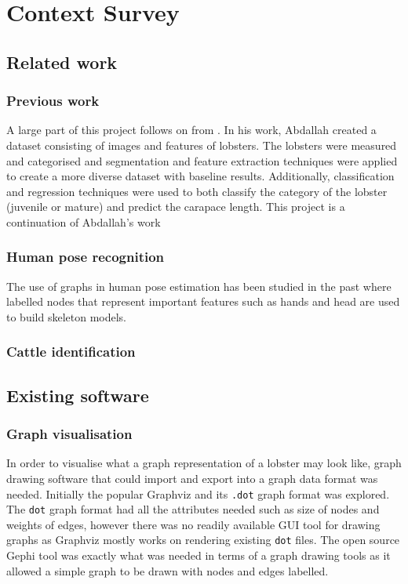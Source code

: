 \section{Context Survey}

\subsection{Related work}

\subsubsection{Previous work}
A large part of this project follows on from \cite{lobster-thesis}. In his work, Abdallah created a dataset consisting of images and features of lobsters. The lobsters were measured and categorised and segmentation and feature extraction techniques were applied to create a more diverse dataset with baseline results.  Additionally, classification and regression techniques were used to both classify the category of the lobster (juvenile or mature) and predict the carapace length. 
\n
This project is a continuation of Abdallah's work

\subsubsection{Human pose recognition}
The use of graphs in human pose estimation has been studied in the past
\cite{human-pose} \cite{human-skeleton} where labelled nodes that represent important features such as hands and head are used to build skeleton models. 
\subsubsection{Cattle identification}

\subsection{Existing software}


\subsubsection{Graph visualisation}
In order to visualise what a graph representation of a lobster may look like, graph drawing software that could import and export into a graph data format was needed. Initially the popular Graphviz and its \texttt{.dot} graph format \cite{graphviz-dot} was explored. The \texttt{dot} graph format had all the attributes needed such as size of nodes and weights of edges, however there was no readily available GUI tool for drawing graphs as Graphviz mostly works on rendering existing \texttt{dot} files. 
\n
The open source Gephi \cite{gephi} tool was exactly what was needed in terms of a graph drawing tools as it allowed a simple graph to be drawn with nodes and edges labelled.


